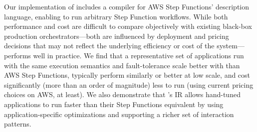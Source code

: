 Our implementation of \name{} includes a compiler for AWS Step Functions'
description language, enabling \name{} to run arbitrary Step Function workflows.
While both performance and cost are difficult to compare objectively with
existing black-box production orchestrators---both are influenced by deployment
and pricing decisions that may not reflect the underlying efficiency or cost of
the system---\name{} performs well in practice. We find that a representative
set of applications run with the same execution semantics and fault-tolerance
scale better with \name{} than AWS Step Functions, typically perform similarly
or better at low scale, and cost significantly (more than an order of magnitude)
less to run (using current pricing choices on AWS, at least). We also
demonstrate that \name{}'s IR allows hand-tuned applications to run faster than
their Step Functions equivalent by using application-specific optimizations and
supporting a richer set of interaction patterns.





